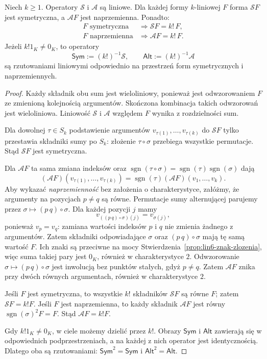 \begin{twierdzenie}
\label{thm:lin8-operatory-wlasnosci}
Niech \(k\geq1\).
Operatory \(\mathcal S\) i
\(\mathcal A\) są liniowe.
Dla każdej formy \(k\)-liniowej \(F\)
forma \(\mathcal SF\) jest symetryczna,
a \(\mathcal AF\) jest naprzemienna.
Ponadto:
\[
 \begin{aligned}
 F\text{ symetryczna}&\Longrightarrow
            \mathcal SF=k!\,F,\\
 F\text{ naprzemienna}&\Longrightarrow
            \mathcal AF=k!\,F.
 \end{aligned}
\]
Jeżeli \(k!1_K\ne0_K\),
to operatory
\[
 \mathsf{Sym}:=(k!)^{-1}\mathcal S,
 \qquad
 \mathsf{Alt}:=(k!)^{-1}\mathcal A
\]
są rzutowaniami liniowymi
odpowiednio na przestrzeń form
symetrycznych i naprzemiennych.
\end{twierdzenie}
\begin{proof}
Każdy składnik obu sum jest
wieloliniowy, ponieważ jest
odwzorowaniem \(F\)
ze zmienioną kolejnością argumentów.
Skończona kombinacja takich
odwzorowań jest wieloliniowa.
Liniowość \(\mathcal S\)
i \(\mathcal A\) względem \(F\)
wynika z rozdzielności sum.

Dla dowolnej \(\tau\in S_k\)
podstawienie argumentów
\(v_{\tau(1)},\ldots,v_{\tau(k)}\)
do \(\mathcal SF\) tylko
przestawia składniki sumy po \(S_k\):
złożenie \(\tau\circ\sigma\)
przebiega wszystkie permutacje.
Stąd \(\mathcal SF\) jest symetryczna.

Dla \(\mathcal AF\)
ta sama zmiana indeksów
oraz
\(\operatorname{sgn}(\tau\circ\sigma)
=\operatorname{sgn}(\tau)
 \operatorname{sgn}(\sigma)\)
dają
\[
 (\mathcal AF)(v_{\tau(1)},\ldots,v_{\tau(k)})
 =\operatorname{sgn}(\tau)
  (\mathcal AF)(v_1,\ldots,v_k).
\]
Aby wykazać \emph{naprzemienność}
bez założenia o charakterystyce,
załóżmy, że argumenty na
pozycjach \(p\ne q\) są równe.
Permutacje sumy alternującej
parujemy przez
\(\sigma\mapsto(p\,q)\circ\sigma\).
Dla każdej pozycji \(j\) mamy
\[
 v_{((p\,q)\circ\sigma)(j)}
 =v_{\sigma(j)},
\]
ponieważ \(v_p=v_q\):
zamiana wartości indeksów \(p\) i \(q\)
nie zmienia żadnego z argumentów.
Zatem składniki odpowiadające
\(\sigma\) oraz \((p\,q)\circ\sigma\)
mają tę samą wartość \(F\).
Ich znaki są przeciwne na mocy
Stwierdzenia~\ref{prop:lin6-znak-zlozenia},
więc suma takiej pary jest \(0_K\),
również w charakterystyce \(2\).
Odwzorowanie
\(\sigma\mapsto(p\,q)\circ\sigma\)
jest inwolucją bez punktów stałych,
gdyż \(p\ne q\).
Zatem \(\mathcal AF\)
znika przy dwóch równych argumentach,
również w charakterystyce \(2\).

Jeśli \(F\) jest symetryczna,
to wszystkie \(k!\) składników
\(\mathcal SF\) są równe \(F\);
zatem \(\mathcal SF=k!F\).
Jeśli \(F\) jest naprzemienna,
to każdy składnik \(\mathcal AF\)
jest równy
\(\operatorname{sgn}(\sigma)^2 F=F\).
Stąd \(\mathcal AF=k!F\).

Gdy \(k!1_K\ne0_K\), w ciele
możemy dzielić przez \(k!\).
Obrazy \(\mathsf{Sym}\) i
\(\mathsf{Alt}\) zawierają się
w odpowiednich podprzestrzeniach,
a na każdej z nich operator
jest identycznością.
Dlatego oba są rzutowaniami:
\(\mathsf{Sym}^2=\mathsf{Sym}\)
i \(\mathsf{Alt}^2=\mathsf{Alt}\).
\end{proof}

